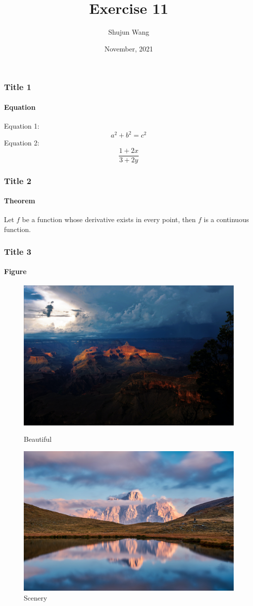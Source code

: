 \documentclass[10pt]{beamer}
\title{Exercise 11}
\author{Shujun Wang}
\institute{University of Zurich}
\date{November, 2021}
\begin{document}
\frame{\titlepage}

\begin{frame}
\frametitle{Title 1}
\framesubtitle{Equation}
Equation 1:
\begin{equation}
a^2 + b^2 = c^2
\end{equation}
Equation 2:
\begin{equation}
\frac{1+ 2x}{3 + 2y}
\end{equation}
\end{frame}

\begin{frame}
\frametitle{Title 2}
\framesubtitle{Theorem}
\begin{theorem}
Let \(f\) be a function whose derivative exists in every point, then \(f\) is a continuous function.
\end{theorem}
\end{frame}

\begin{frame}
\frametitle{Title 3}
\framesubtitle{Figure}
\begin{figure}
\centering
\begin{minipage}[b]{0.4\textwidth}
\includegraphics[width=\linewidth]{figure1.jpg}
\caption{Beautiful}
\end{minipage}
\begin{minipage}[b]{0.4\textwidth}
\includegraphics[width=\linewidth]{figure2.jpg}
\caption{Scenery}
\end{minipage}
\end{figure}
\end{frame}
\end{document}
